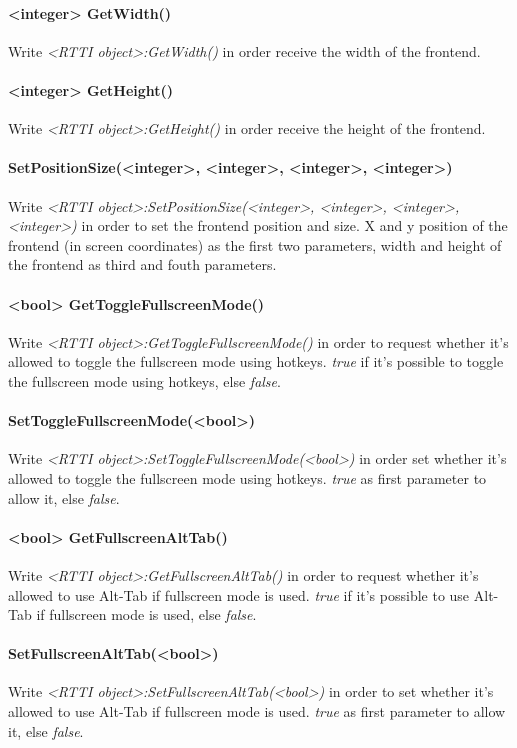 \paragraph{<integer> GetWidth()}
Write \emph{<RTTI object>:GetWidth()} in order receive the width of the frontend.

\paragraph{<integer> GetHeight()}
Write \emph{<RTTI object>:GetHeight()} in order receive the height of the frontend.

\paragraph{SetPositionSize(<integer>, <integer>, <integer>, <integer>)}
Write \emph{<RTTI object>:SetPositionSize(<integer>, <integer>, <integer>, <integer>)} in order to set the frontend position and size. X and y position of the frontend (in screen coordinates) as the first two parameters, width and height of the frontend as third and fouth parameters.

\paragraph{<bool> GetToggleFullscreenMode()}
Write \emph{<RTTI object>:GetToggleFullscreenMode()} in order to request whether it's allowed to toggle the fullscreen mode using hotkeys. \emph{true} if it's possible to toggle the fullscreen mode using hotkeys, else \emph{false}.

\paragraph{SetToggleFullscreenMode(<bool>)}
Write \emph{<RTTI object>:SetToggleFullscreenMode(<bool>)} in order set whether it's allowed to toggle the fullscreen mode using hotkeys. \emph{true} as first parameter to allow it, else \emph{false}.

\paragraph{<bool> GetFullscreenAltTab()}
Write \emph{<RTTI object>:GetFullscreenAltTab()} in order to request whether it's allowed to use Alt-Tab if fullscreen mode is used. \emph{true} if it's possible to use Alt-Tab if fullscreen mode is used, else \emph{false}.

\paragraph{SetFullscreenAltTab(<bool>)}
Write \emph{<RTTI object>:SetFullscreenAltTab(<bool>)} in order to set whether it's allowed to use Alt-Tab if fullscreen mode is used. \emph{true} as first parameter to allow it, else \emph{false}.

